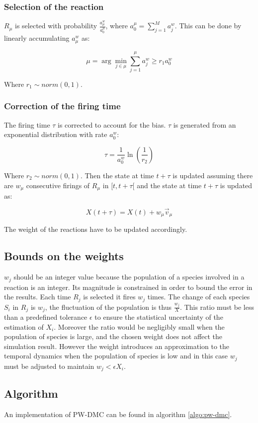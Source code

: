     \subsubsection{Selection of the reaction}
    $R_\mu$ is selected with probability $\frac{a_\mu^w}{a_0^\mu}$, where $a_0^\mu = \sum\limits_{j=1}^Ma_j^w$.
    This can be done by linearly accumulating $a_\mu^w$ as:

    $$\mu = \arg\min\limits_{j\in \mu}\sum\limits_{j=1}^\mu a_j^w\ge r_1a_0^w$$

    Where $r_1\sim norm(0,1)$.

    \subsubsection{Correction of the firing time}
    The firing time $\tau$ is corrected to account for the bias.
    $\tau$ is generated from an exponential distribution with rate $a_0^w$:

    $$\tau = \frac{1}{a_0^w}\ln\left(\frac{1}{r_2}\right)$$

    Where $r_2\sim norm(0,1)$.
    Then the state at time $t+\tau$ is updated assuming there are $w_\mu$ consecutive firings of $R_\mu$ in $[t,t+\tau[$ and the state at time $t+\tau$ is updated as:

    $$X(t+\tau) = X(t) + w_\mu\vec{v}_\mu$$

    The weight of the reactions have to be updated accordingly.

  \subsection{Bounds on the weights}
  $w_j$ should be an integer value because the population of a species involved in a reaction is an integer.
  Its magnitude is constrained in order to bound the error in the results.
  Each time $R_j$ is selected it fires $w_j$ times.
  The change of each species $S_i$ in $R_j$ is $w_j$, the fluctuation of the population is thus $\frac{w_j}{X}$.
  This ratio must be less than a predefined tolerance $\epsilon$ to ensure the statistical uncertainty of the estimation of $X_i$.
  Moreover the ratio would be negligibly small when the population of species is large, and the chosen weight does not affect the simulation result.
  However the weight introduces an approximation to the temporal dynamics when the population of species is low and in this case $w_j$ must be adjusted to maintain $w_j< \epsilon X_i$.

  \subsection{Algorithm}
  An implementation of PW-DMC can be found in algorithm \ref{algo:pw-dmc}.

